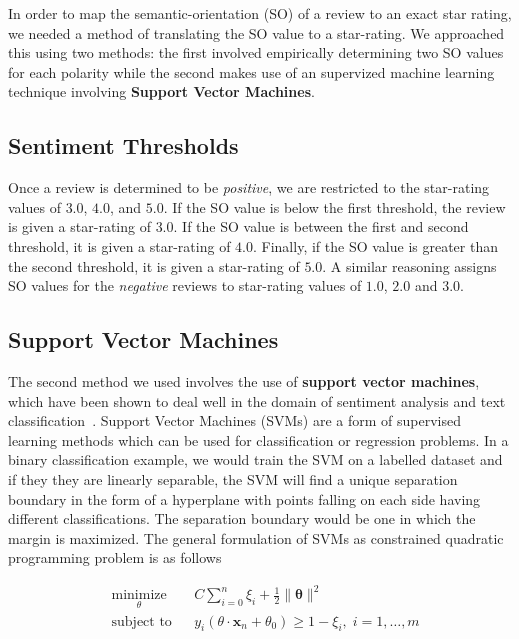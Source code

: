 \documentclass[11pt]{report} %
\begin{document}
In order to map the semantic-orientation (SO) of a review to an exact star rating, we needed a method of translating the SO value to a star-rating. We approached this using two methods: the first involved empirically determining two SO values for each polarity while the second makes use of an supervized machine learning technique involving \textbf{Support Vector Machines}.

\subsection{Sentiment Thresholds}
Once a review is determined to be \textit{positive}, we are restricted to the star-rating values of $3.0$, $4.0$, and $5.0$. If the SO value is below the first threshold, the review is given a star-rating of $3.0$. If the SO value is between the first and second threshold, it is given a star-rating of $4.0$. Finally, if the SO value is greater than the second threshold, it is given a star-rating of $5.0$. A similar reasoning assigns SO values for the \textit{negative} reviews to star-rating values of $1.0$, $2.0$ and $3.0$.

\subsection{Support Vector Machines}
The second method we used involves the use of \textbf{support vector machines}, which have been shown to deal well in the domain of sentiment analysis and text classification~\cite{mullen2004sentiment,gamon2004sentiment}. Support Vector Machines (SVMs) are a form of supervised learning methods which can be used for classification or regression problems. In a binary classification example, we would train the SVM on a labelled dataset and if they they are linearly separable, the SVM will find a unique separation boundary in the form of a hyperplane with points falling on each side having different classifications. The separation boundary would be one in which the margin is maximized. The general formulation of SVMs as constrained quadratic programming problem is as follows

	\begin{equation*}
	\label{equation:svm}
	\begin{aligned}
	& \underset{\theta}{\text{minimize}}
	& & C\sum_{i=0}^n\xi_{i} + \frac{1}{2} \parallel\mathbf{\theta}\parallel^{2}  \\
	& \text{subject to}
	& & y_{i}(\theta\cdot\mathbf{x}_{n}+\theta_{0}) \ge 1 - \xi_{i}, \; i = 1, \ldots, m
	\end{aligned}
	\end{equation*}
\end{document}
